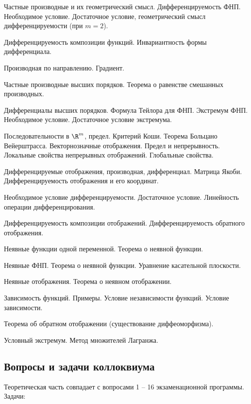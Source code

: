 \documentclass[a4paper]{article}
\begin{document}
\begin{nums}{-2}
\item Частные производные и их геометрический смысл. Дифференцируемость ФНП. Необходимое условие.
Достаточное условие, геометрический смысл дифференцируемости (при $m=2$).
\item Дифференцируемость композиции функций. Инвариантность формы дифференциала.
\item Производная по направлению. Градиент.
\item Частные производные высших порядков. Теорема о равенстве смешанных производных.
\item Дифференциалы высших порядков. Формула Тейлора для ФНП. Экстремум ФНП. Необходимое условие. Достаточное условие
экстремума.
\item Последовательности в $\R^m$, предел. Критерий Коши. Теорема Больцано Вейерштрасса. Векторнозначные отображения.
Предел и непрерывность. Локальные свойства непрерывных отображений. Глобальные свойства.
\item Дифференцируемые отображения, производная, дифференциал.  Матрица Якоби. Дифференцируемость
отображения и его координат.
\item Необходимое условие дифференцируемости. Достаточное условие. Линейность операции дифференцирования.
\item Дифференцируемость композиции отображений. Дифференцируемость обратного отображения.
\item Неявные функции одной переменной. Теорема о неявной функции.
\item Неявные ФНП. Теорема о неявной функции. Уравнение касательной плоскости.
\item Неявные отображения. Теорема о неявном отображении.
\item Зависимость функций. Примеры. Условие независимости функций. Условие зависимости.
\item Теорема об обратном отображении (существование диффеоморфизма).
\item Условный экстремум. Метод множителей Лагранжа.
\end{nums}

\subsection{Вопросы и задачи коллоквиума}

Теоретическая часть совпадает с вопросами 1 -- 16 экзаменационной программы. Задачи:
\end{document}
